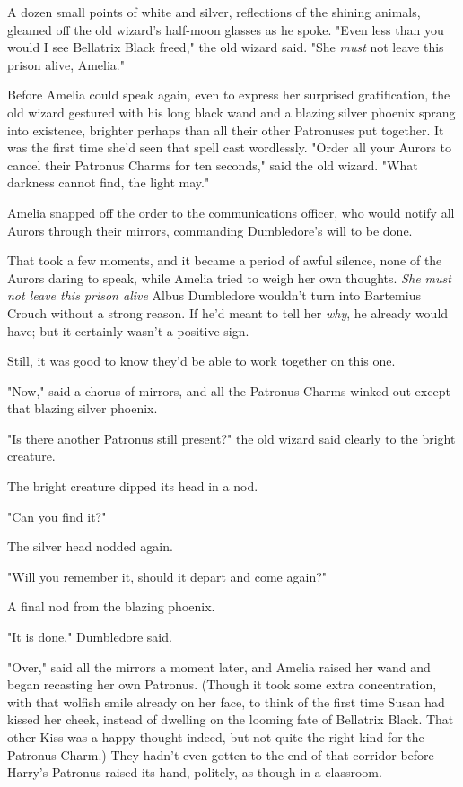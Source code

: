 A dozen small points of white and silver, reflections of the shining animals,
gleamed off the old wizard's half-moon glasses as he spoke. "Even less than you
would I see Bellatrix Black freed," the old wizard said. "She \emph{must} not
leave this prison alive, Amelia."

Before Amelia could speak again, even to express her surprised gratification,
the old wizard gestured with his long black wand and a blazing silver phoenix
sprang into existence, brighter perhaps than all their other Patronuses put
together. It was the first time she'd seen that spell cast wordlessly. "Order
all your Aurors to cancel their Patronus Charms for ten seconds," said the old
wizard. "What darkness cannot find, the light may."

Amelia snapped off the order to the communications officer, who would notify
all Aurors through their mirrors, commanding Dumbledore's will to be done.

That took a few moments, and it became a period of awful silence, none of the
Aurors daring to speak, while Amelia tried to weigh her own thoughts. \emph{She
must not leave this prison alive{\el}} Albus Dumbledore wouldn't turn into
Bartemius Crouch without a strong reason. If he'd meant to tell her \emph{why},
he already would have; but it certainly wasn't a positive sign.

Still, it was good to know they'd be able to work together on this one.

"Now," said a chorus of mirrors, and all the Patronus Charms winked out except
that blazing silver phoenix.

"Is there another Patronus still present?" the old wizard said clearly to the
bright creature.

The bright creature dipped its head in a nod.

"Can you find it?"

The silver head nodded again.

"Will you remember it, should it depart and come again?"

A final nod from the blazing phoenix.

"It is done," Dumbledore said.

"Over," said all the mirrors a moment later, and Amelia raised her wand and
began recasting her own Patronus. (Though it took some extra concentration,
with that wolfish smile already on her face, to think of the first time Susan
had kissed her cheek, instead of dwelling on the looming fate of Bellatrix
Black. That other Kiss was a happy thought indeed, but not quite the right kind
for the Patronus Charm.)
\sbreak
They hadn't even gotten to the end of that corridor before Harry's Patronus
raised its hand, politely, as though in a classroom.

